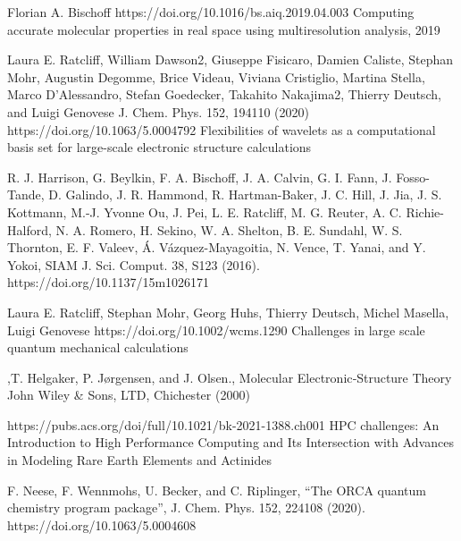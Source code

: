 \documentclass[%
 aip,
 amsmath,amssymb,
 reprint,%
]{revtex4-1}
\begin{document}
\begin{thebibliography}{}


Florian A. Bischoff https://doi.org/10.1016/bs.aiq.2019.04.003  Computing accurate molecular properties in real space using multiresolution analysis,  2019

Laura E. Ratcliff,  William Dawson2, Giuseppe Fisicaro, Damien Caliste, Stephan Mohr, Augustin Degomme, Brice Videau, Viviana Cristiglio, Martina Stella, Marco D’Alessandro, Stefan Goedecker, Takahito Nakajima2, Thierry Deutsch, and Luigi Genovese J. Chem. Phys. 152, 194110 (2020) https://doi.org/10.1063/5.0004792 Flexibilities of wavelets as a computational basis set for large-scale electronic structure calculations

R. J. Harrison, G. Beylkin, F. A. Bischoff, J. A. Calvin, G. I. Fann, J. Fosso-Tande, D. Galindo, J. R. Hammond, R. Hartman-Baker, J. C. Hill, J. Jia, J. S. Kottmann, M.-J. Yvonne Ou, J. Pei, L. E. Ratcliff, M. G. Reuter, A. C. Richie-Halford, N. A. Romero, H. Sekino, W. A. Shelton, B. E. Sundahl, W. S. Thornton, E. F. Valeev, Á. Vázquez-Mayagoitia, N. Vence, T. Yanai, and Y. Yokoi, SIAM J. Sci. Comput. 38, S123 (2016). https://doi.org/10.1137/15m1026171

Laura E. Ratcliff, Stephan Mohr, Georg Huhs, Thierry Deutsch, Michel Masella, Luigi Genovese  https://doi.org/10.1002/wcms.1290 Challenges in large scale quantum mechanical calculations

,T. Helgaker, P. Jørgensen, and J. Olsen., Molecular Electronic‐Structure Theory  John Wiley \& Sons, LTD, Chichester (2000)

 https://pubs.acs.org/doi/full/10.1021/bk-2021-1388.ch001  HPC challenges: An Introduction to High Performance Computing and Its Intersection with Advances in Modeling Rare Earth Elements and Actinides
 
 F. Neese, F. Wennmohs, U. Becker, and C. Riplinger, “The ORCA quantum chemistry program package”, J. Chem. Phys. 152, 224108 (2020). https://doi.org/10.1063/5.0004608
 

\end{thebibliography}
\end{document}

